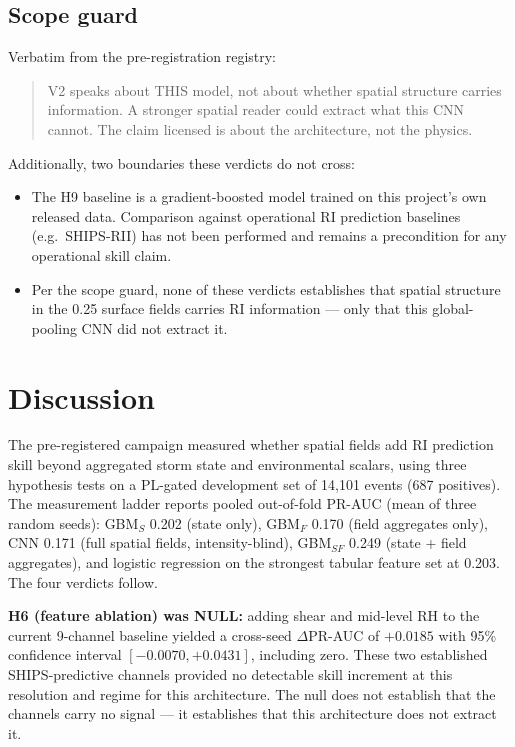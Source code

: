 \documentclass[11pt]{article}
\begin{document}
\subsection{Scope guard}

Verbatim from the pre-registration registry:

\begin{quote}
V2 speaks about THIS model, not about whether spatial structure carries
information. A stronger spatial reader could extract what this CNN cannot. The
claim licensed is about the architecture, not the physics.
\end{quote}

Additionally, two boundaries these verdicts do not cross:

\begin{itemize}
  \item The H9 baseline is a gradient-boosted model trained on this project's
  own released data. Comparison against operational RI prediction baselines
  (e.g.\ SHIPS-RII) has not been performed and remains a precondition for any
  operational skill claim.
  \item Per the scope guard, none of these verdicts establishes that spatial
  structure in the 0.25\textdegree{} surface fields carries RI information ---
  only that this global-pooling CNN did not extract it.
\end{itemize}

\section{Discussion}

The pre-registered campaign measured whether spatial fields add RI prediction
skill beyond aggregated storm state and environmental scalars, using three
hypothesis tests on a PL-gated development set of 14{,}101 events (687
positives). The measurement ladder reports pooled out-of-fold PR-AUC (mean of
three random seeds): GBM$_S$ 0.202 (state only), GBM$_F$ 0.170 (field
aggregates only), CNN 0.171 (full spatial fields, intensity-blind), GBM$_{SF}$
0.249 (state + field aggregates), and logistic regression on the strongest
tabular feature set at 0.203. The four verdicts follow.

\textbf{H6 (feature ablation) was NULL:} adding shear and mid-level RH to the
current 9-channel baseline yielded a cross-seed $\Delta$PR-AUC of $+0.0185$
with 95\% confidence interval $[-0.0070, +0.0431]$, including zero. These two
established SHIPS-predictive channels provided no detectable skill increment at
this resolution and regime for this architecture. The null does not establish
that the channels carry no signal --- it establishes that this architecture
does not extract it.
\end{document}
